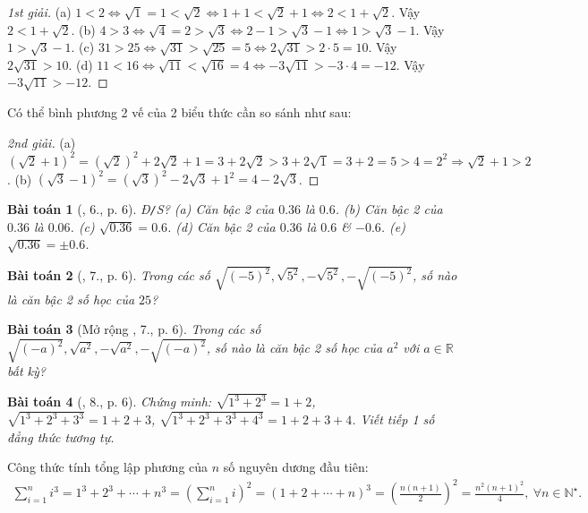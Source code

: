 \documentclass{article}
\newtheorem{baitoan}{Bài toán}
\begin{document}
\begin{proof}[1st giải]
	(a) $1 < 2\Leftrightarrow\sqrt{1} = 1 < \sqrt{2}\Leftrightarrow1 + 1 < \sqrt{2} + 1\Leftrightarrow 2 < 1 + \sqrt{2}$. Vậy $2 < 1 + \sqrt{2}$. (b) $4 > 3\Leftrightarrow\sqrt{4} = 2 > \sqrt{3}\Leftrightarrow2 - 1 > \sqrt{3} - 1\Leftrightarrow1 > \sqrt{3} - 1$. Vậy $1 > \sqrt{3} - 1$. (c) $31 > 25\Leftrightarrow\sqrt{31} > \sqrt{25} = 5\Leftrightarrow2\sqrt{31} > 2\cdot5 = 10$. Vậy $2\sqrt{31} > 10$. (d) $11 < 16\Leftrightarrow\sqrt{11} < \sqrt{16} = 4\Leftrightarrow-3\sqrt{11} > -3\cdot4 = -12$. Vậy $-3\sqrt{11} > -12$.
\end{proof}
Có thể bình phương 2 vế của 2 biểu thức cần so sánh như sau:
\begin{proof}[2nd giải]
	(a) $(\sqrt{2} + 1)^2 = (\sqrt{2})^2 + 2\sqrt{2} + 1 = 3 + 2\sqrt{2} > 3 + 2\sqrt{1} = 3 + 2 = 5 > 4 = 2^2\Rightarrow\sqrt{2} + 1 > 2$. (b) $(\sqrt{3} - 1)^2 = (\sqrt{3})^2 - 2\sqrt{3} + 1^2 = 4 - 2\sqrt{3}$.
\end{proof}

\begin{baitoan}[\cite{SBT_Toan_9_tap_1}, 6., p. 6]
	\emph{Đ\texttt{/}S?} (a) Căn bậc 2 của $0.36$ là $0.6$. (b) Căn bậc 2 của $0.36$ là $0.06$. (c) $\sqrt{0.36} = 0.6$. (d) Căn bậc 2 của $0.36$ là $0.6$ \& $-0.6$. (e) $\sqrt{0.36} = \pm0.6$.
\end{baitoan}

\begin{baitoan}[\cite{SBT_Toan_9_tap_1}, 7., p. 6]
	Trong các số $\sqrt{(-5)^2},\sqrt{5^2},-\sqrt{5^2},-\sqrt{(-5)^2}$, số nào là căn bậc 2 số học của $25$?
\end{baitoan}

\begin{baitoan}[Mở rộng \cite{SBT_Toan_9_tap_1}, 7., p. 6]
	Trong các số $\sqrt{(-a)^2},\sqrt{a^2},-\sqrt{a^2},-\sqrt{(-a)^2}$, số nào là căn bậc 2 số học của $a^2$ với $a\in\mathbb{R}$ bất kỳ?
\end{baitoan}

\begin{baitoan}[\cite{SBT_Toan_9_tap_1}, 8., p. 6]
	Chứng minh: $\sqrt{1^3 + 2^3} = 1 + 2$, $\sqrt{1^3 + 2^3 + 3^3} = 1 + 2 + 3$, $\sqrt{1^3 + 2^3 + 3^3 + 4^3} = 1 + 2 + 3 + 4$. Viết tiếp 1 số đẳng thức tương tự. 
\end{baitoan}
Công thức tính tổng lập phương của $n$ số nguyên dương đầu tiên:
\begin{align*}
	\sum_{i=1}^n i^3 = 1^3 + 2^3 + \cdots + n^3 = \left(\sum_{i=1}^n i\right)^2 = (1 + 2 + \cdots + n)^3 = \left(\frac{n(n + 1)}{2}\right)^2 = \frac{n^2(n + 1)^2}{4},\ \forall n\in\mathbb{N}^\star.
\end{align*}
\end{document}
